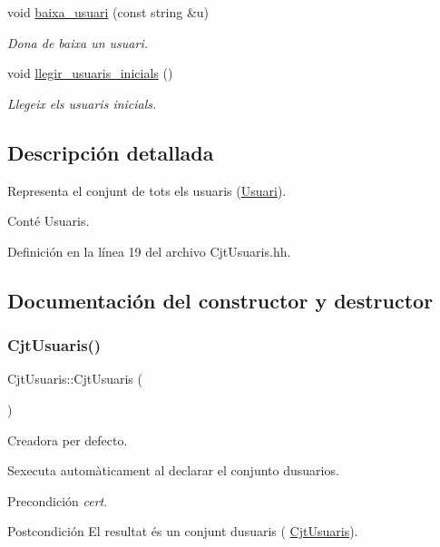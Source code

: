 \begin{DoxyCompactItemize}
void \mbox{\hyperlink{class_cjt_usuaris_a8aa977e92fd28d1c1dd1604ec3ed21e8}{baixa\+\_\+usuari}} (const string \&u)
\begin{DoxyCompactList}\small\item\em Dona de baixa un usuari. \end{DoxyCompactList}\item 
void \mbox{\hyperlink{class_cjt_usuaris_acb8d525b500b034d277c48197d16a682}{llegir\+\_\+usuaris\+\_\+inicials}} ()
\begin{DoxyCompactList}\small\item\em Llegeix els usuaris inicials. \end{DoxyCompactList}\end{DoxyCompactItemize}


\subsection{Descripción detallada}
Representa el conjunt de tots els usuaris (\mbox{\hyperlink{class_usuari}{Usuari}}).

Conté Usuaris. 

Definición en la línea 19 del archivo Cjt\+Usuaris.\+hh.



\subsection{Documentación del constructor y destructor}
\mbox{\label{class_cjt_usuaris_a66bec1ef851247d1729414abcfcba4a6}} 
\subsubsection{\texorpdfstring{Cjt\+Usuaris()}{CjtUsuaris()}}
{\footnotesize\ttfamily Cjt\+Usuaris\+::\+Cjt\+Usuaris (\begin{DoxyParamCaption}{ }\end{DoxyParamCaption})}



Creadora per defecto. 

S\textquotesingle{}executa automàticament al declarar el conjunto d\textquotesingle{}usuarios. \begin{DoxyPrecond}{Precondición}
{\itshape cert}. 
\end{DoxyPrecond}
\begin{DoxyPostcond}{Postcondición}
El resultat és un conjunt d\textquotesingle{}usuaris ( \mbox{\hyperlink{class_cjt_usuaris}{Cjt\+Usuaris}}). 
\end{DoxyPostcond}



